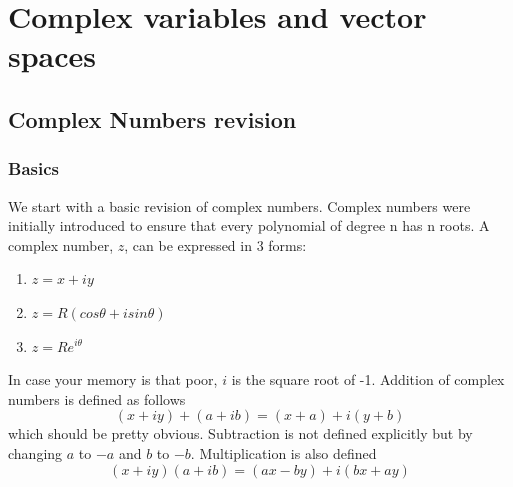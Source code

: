 \chapter{Complex variables and vector spaces}
\minitoc
\pagebreak
\section{Complex Numbers revision}
\subsection{Basics}
We start with a basic revision of complex numbers.
 Complex numbers were initially introduced to ensure that every polynomial of degree n has n roots. 
 A complex number, $z$, can be expressed in 3 forms:
\begin{enumerate}
	\item $z=x+iy$
	\item $z=R(cos\theta+isin\theta)$
	\item $z=Re^{i\theta}$
\end{enumerate}
In case your memory is that poor, $i$ is the square root of -1.
 Addition of complex numbers is defined as follows $$(x+iy) + (a+ib) = (x+a) + i(y+b) $$
which should be pretty obvious.
 Subtraction is not defined explicitly but by changing $a$ to $-a$ and $b$ to $-b$.
  Multiplication is also defined $$(x+iy)(a+ib) = (ax-by)+i(bx+ay)$$
